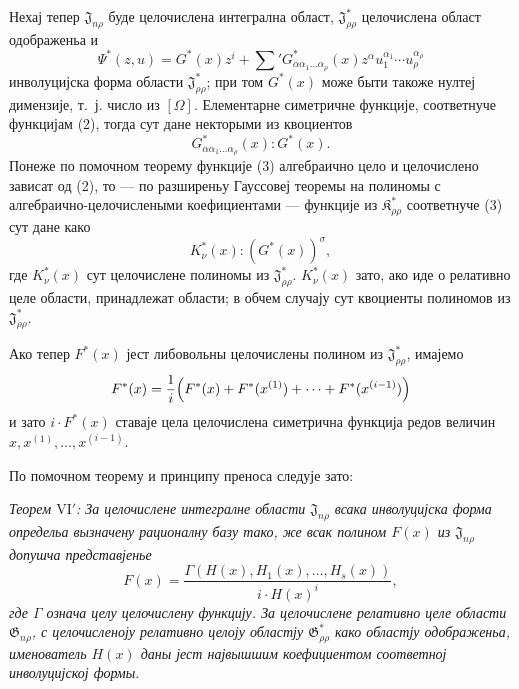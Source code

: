 ﻿\documentclass[11pt]{article}
\providecommand{\Kfield}{\mathfrak{K}}
\providecommand{\Jdom}{\mathfrak{J}}
\providecommand{\Gdom}{\mathfrak{G}}
\begin{document}
Нехај тепер $\Jdom_{n\rho}$ буде целочислена интегрална област, $\Jdom^*_{\rho\rho}$ целочислена област одображеньа и
\[
  \Psi^*(z,u)=G^*(x)z^i+
  \sum{}'G^*_{\alpha\alpha_1\ldots\alpha_\rho}(x)
  z^\alpha u_1^{\alpha_1}\cdots u_\rho^{\alpha_\rho}
\]
инволуцијска форма области $\Jdom^*_{\rho\rho}$; при том $G^*(x)$ може быти такоже нултеј димензије, т.~ј. число из $[\Omega]$. Елементарне симетричне функције, соответнуче функцијам (2), тогда сут дане некторыми из квоциентов
\begin{equation}
  G^*_{\alpha\alpha_1\ldots\alpha_\rho}(x):G^*(x).
\tag{4}
\end{equation}
Понеже по помочном теорему функције (3) алгебраично цело и целочислено зависат од (2), то --- по разширеньу Гауссовеј теоремы на полиномы с алгебраично-целочислеными коефициентами --- функције из $\Kfield^*_{\rho\rho}$ соответнуче (3) сут дане како
\begin{equation}
  K_\nu^*(x):(G^*(x))^\sigma,
\tag{5}
\end{equation}
где $K_\nu^*(x)$ сут целочислене полиномы из $\Jdom^*_{\rho\rho}$. $K_\nu^*(x)$ зато, ако иде о релативно целе области, принадлежат области; в обчем случају сут квоциенты полиномов из $\Jdom^*_{\rho\rho}$.

Ако тепер $F^*(x)$ јест либовольны целочислены полином из $\Jdom^*_{\rho\rho}$, имајемо
\[
  F^*(x)=\frac1i\Bigl(F^*(x)+F^*(x^{(1)})+\cdots+F^*(x^{(i-1)})\Bigr)
\]
и зато $i\cdot F^*(x)$ ставаје цела целочислена симетрична функција редов величин $x,x^{(1)},\ldots,x^{(i-1)}$.

По помочном теорему и принципу преноса следује зато:

{\itshape Теорем $\mathrm{VI}'$: За целочислене интегралне области $\Jdom_{n\rho}$ всака инволуцијска форма определьа вызначену рационалну базу тако, же всак полином $F(x)$ из $\Jdom_{n\rho}$ допушча представјенье}
\[
  F(x)=\frac{\Gamma(H(x),H_1(x),\ldots,H_s(x))}{i\cdot H(x)^i},
\]
{\itshape где $\Gamma$ означа целу целочислену функцију. За целочислене релативно целе области $\Gdom_{n\rho}$, с целочисленоју релативно целоју областју $\Gdom^*_{\rho\rho}$ како областју одображеньа, именователь $H(x)$ даны јест највышшим коефициентом соответној инволуцијској формы.}
\end{document}
